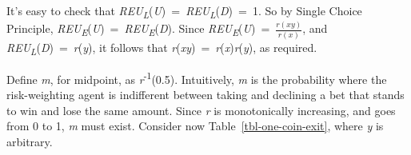 \documentclass[
  12pt,
  letterpaper,
  DIV=11,
  numbers=noendperiod]{scrreprt}
\begin{document}
It's easy to check that
\emph{REU\textsubscript{L}}(\emph{U})~=~\emph{REU\textsubscript{L}}(\emph{D})~=~1.
So by Single Choice Principle,
\emph{REU\textsubscript{E}}(\emph{U})~=~\emph{REU\textsubscript{E}}(\emph{D}).
Since \emph{REU\textsubscript{E}}(\emph{U})~=~\(\frac{r(xy)}{r(x)}\),
and \emph{REU\textsubscript{L}}(\emph{D})~=~\emph{r}(\emph{y}), it
follows that \emph{r}(\emph{xy})~=~\emph{r}(\emph{x})\emph{r}(\emph{y}),
as required.

Define \emph{m}, for midpoint, as \emph{r}\textsuperscript{-1}(0.5).
Intuitively, \emph{m} is the probability where the risk-weighting agent
is indifferent between taking and declining a bet that stands to win and
lose the same amount. Since \emph{r} is monotonically increasing, and
goes from 0 to 1, \emph{m} must exist. Consider now
Table~\ref{tbl-one-coin-exit}, where \emph{y} is arbitrary.

\begin{table}

\caption{\label{tbl-one-coin-exit}An exit game with exit payout 1.}

\begin{minipage}[t]{0.50\linewidth}



\end{minipage}%
%
\begin{minipage}[t]{0.50\linewidth}



\end{minipage}%

\end{table}%
\end{document}
